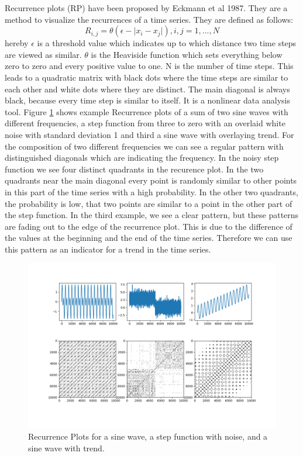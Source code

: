 \documentclass{article}
\begin{document}
Recurrence plots (RP) have been proposed by Eckmann et al 1987. They are a method to visualize the recurrences of a time series.
They are defined as follows:
$$R_{i,j} = \theta(\epsilon - \lvert x_i - x_j \rvert), i,j = 1,...,N$$
hereby $\epsilon$ is a threshold value which indicates up to which distance two time steps are viewed as similar.
$\theta$ is the Heaviside function which sets everything below zero to zero and every positive value to one.
N is the number of time steps.
This leads to a quadratic matrix with black dots where the time steps are similar to each other and white dots where they are distinct.
The main diagonal is always black, because every time step is similar to itself.
It is a nonlinear data analysis tool.
Figure \ref{rplots} shows example Recurrence plots of a sum of two sine waves with different frequencies,
a step function from three to zero with an overlaid white noise with standard deviation 1 and third a sine wave with overlaying trend.
For the composition of two different frequencies we can see a regular pattern with distinguished diagonals which are indicating the frequency.
In the noisy step function we see four distinct quadrants in the recurence plot.
In the two quadrants near the main diagonal every point is randomly similar to other points in this part of the time series with a high probability.
In the other two quadrants, the probability is low, that two points are similar to a point in the other part of the step function.
In the third example, we see a clear pattern, but these patterns are fading out to the edge of the recurrence plot.
This is due to the difference of the values at the beginning and the end of the time series.
Therefore we can use this pattern as an indicator for a trend in the time series.

\begin{figure}
  \includegraphics[width=\textwidth]{figs/rp_methods.png}
  \caption{Recurrence Plots for a sine wave, a step function with noise, and a sine wave with trend.}
  \label{rplots}
\end{figure}
\end{document}
